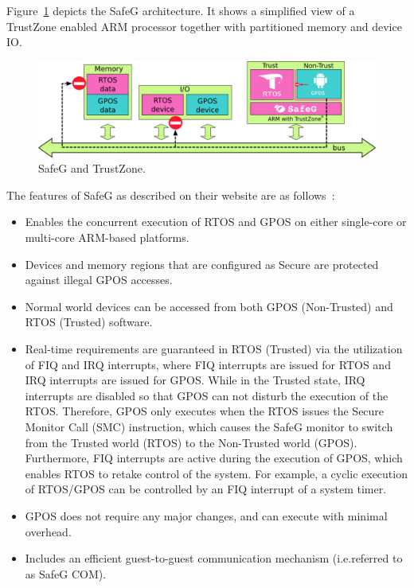Figure~\ref{fig:safeg} depicts the SafeG architecture. It shows a simplified view of a TrustZone enabled ARM processor together with partitioned memory and device IO.

\begin{figure}[H]
\centering
\includegraphics[width=\textwidth]{./img/literature_safeg.png}
\caption{SafeG and TrustZone.}\label{fig:safeg}
\end{figure}

The features of SafeG as described on their website are as follows~\cite{website:safeg}:

\begin{itemize}
\item Enables the concurrent execution of RTOS and GPOS on either single-core or multi-core ARM-based platforms.

\item Devices and memory regions that are configured as Secure are protected against illegal GPOS accesses.

\item Normal world devices can be accessed from both GPOS (Non-Trusted) and RTOS (Trusted) software.

\item Real-time requirements are guaranteed in RTOS (Trusted) via the utilization of FIQ and IRQ interrupts, where FIQ interrupts are issued for RTOS and IRQ interrupts are issued for GPOS. While in the Trusted state, IRQ interrupts are disabled so that GPOS can not disturb the execution of the RTOS. Therefore, GPOS only executes when the RTOS issues the Secure Monitor Call (SMC) instruction, which causes the SafeG monitor to switch from the Trusted world (RTOS) to the Non-Trusted world (GPOS). Furthermore, FIQ interrupts are active during the execution of GPOS, which enables RTOS to retake control of the system. For example, a cyclic execution of RTOS/GPOS can be controlled by an FIQ interrupt of a system timer.

\item GPOS does not require any major changes, and can execute with minimal overhead.

\item Includes an efficient guest-to-guest communication mechanism (i.e.referred to as SafeG COM).
\end{itemize}

